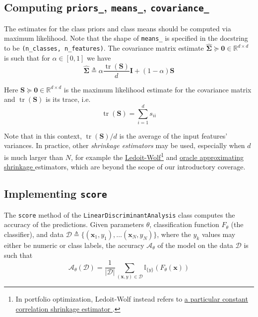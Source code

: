\documentclass{article}
\numberwithin{equation}{section}
\newcommand{\tr}{\operatorname{tr}}
\begin{document}
\subsection{%
    Computing \texttt{priors\_}, \texttt{means\_}, \texttt{covariance\_}%
}

The estimates for the class priors and class means should be computed via
maximum likelihood. Note that the shape of \texttt{means\_} is specified in
the docstring to be \texttt{(n\_classes, n\_features)}. The covariance matrix
estimate $ \hat{\mathbf{\Sigma}} \succeq \mathbf{0} \in
\mathbb{R}^{d \times d} $ is such that for $ \alpha \in [0, 1] $ we have
\begin{equation} \label{cov_est}
    \hat{\mathbf{\Sigma}} \triangleq \alpha\frac{\tr(\mathbf{S})}{d}\mathbf{I}
        + (1 - \alpha)\mathbf{S}
\end{equation}

Here $ \mathbf{S} \succeq \mathbf{0} \in \mathbb{R}^{d \times d} $ is the
maximum likelihood estimate for the covariance matrix and
$ \tr(\mathbf{S}) $ is its trace, i.e.
\begin{equation*}
    \tr(\mathbf{S}) = \sum_{i = 1}^ds_{ii}
\end{equation*}

Note that in this context, $ \tr(\mathbf{S}) / d $ is the average of the
input features' variances. In practice, other \textit{shrinkage estimators}
may be used, especially when $ d $ is much larger than $ N $, for example
the \href{http://www.ledoit.net/ole1a.pdf}{Ledoit-Wolf}\footnote{
    In portfolio optimization, Ledoit-Wolf instead refers to
    \href{http://www.ledoit.net/honey.pdf}{%
        a particular constant correlation shrinkage estimator%
    }.
} and
\href{https://arxiv.org/pdf/0907.4698.pdf}{%
    oracle approximating shrinkage%
} estimators, which are beyond the scope of our introductory coverage.

\subsection{Implementing \texttt{score}}

The \texttt{score} method of the \texttt{LinearDiscriminantAnalysis} class
computes the accuracy of the predictions. Given parameters $ \theta $,
classification function $ F_\theta $ (the classifier), and data
$ \mathcal{D} \triangleq \{(\mathbf{x}_1, y_1), \ldots (\mathbf{x}_N, y_N)\} $,
where the $ y_k $ values may either be numeric or class labels, the accuracy
$ \mathcal{A}_\theta $ of the model on the data $ \mathcal{D} $ is such that
\begin{equation*}
    \mathcal{A}_\theta(\mathcal{D}) = \frac{1}{|\mathcal{D}|}
        \sum_{(\mathbf{x}, y) \in \mathcal{D}}\mathbb{I}_{\{y\}}\left(
            F_\theta(\mathbf{x})
        \right)
\end{equation*}
\end{document}
